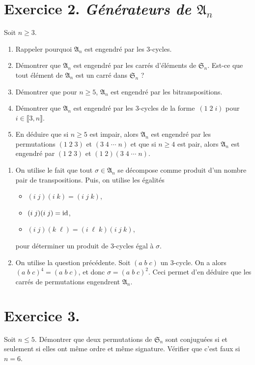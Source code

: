 \documentclass[./main]{subfiles}
\begin{document}
  \section{Exercice 2. \textit{Générateurs de $\mathfrak{A}_n$}}
  \begin{enonce}
    Soit $n \ge 3$.
    \begin{enumerate}
      \item Rappeler pourquoi $\mathfrak{A}_n$ est engendré par les $3$-cycles.
      \item Démontrer que $\mathfrak{A}_n$ est engendré par les carrés d'éléments de $\mathfrak{S}_n$.
        Est-ce que tout élément de $\mathfrak{A}_n$ est un carré dans $\mathfrak{S}_n$ ?
      \item Démontrer que pour $n \ge 5$, $\mathfrak{A}_n$ est engendré par les bitranspositions.
      \item Démontrer que $\mathfrak{A}_n$ est engendré par les $3$-cycles de la forme~$(1\;2\;i)$ pour $i \in \llbracket 3,n\rrbracket$.
      \item En déduire que si $n \ge 5$ est impair, alors $\mathfrak{A}_n$ est engendré par les permutations $(1\;2\;3)$ et $(3\;4\;\cdots\; n)$ et que si $n \ge 4$ est pair, alors $\mathfrak{A}_n$ est engendré par $(1\;2\;3)$ et $(1\;2)(3\;4\;\cdots\; n)$.
    \end{enumerate}
  \end{enonce}

  \begin{enumerate}
    \item On utilise le fait que tout $\sigma \in \mathfrak{A}_n$ se décompose comme produit d'un nombre pair de transpositions.
      Puis, on utilise les égalités 
      \begin{itemize}
        \item $(i\;j)(i\;k) = (i\;j\;k)$,
        \item $(i\;j)(i\;j) = \operatorname{id}$,
        \item $(i\;j)(k\;\ell) = (i\;\ell\;k)(i\;j\;k)$,
      \end{itemize}
      pour déterminer un produit de $3$-cycles égal à $\sigma$.
    \item On utilise la question précédente.
      Soit $(a\;b\;c)$ un $3$-cycle.
      On a alors $(a\;b\;c)^4 = (a\;b\;c)$, et donc $\sigma = (a\;b\;c)^2$.
      Ceci permet d'en déduire que les carrés de permutations engendrent $\mathfrak{A}_n$.
  \end{enumerate}

  \section{Exercice 3.}
  \begin{enonce}
    Soit $n \le 5$. Démontrer que deux permutations de $\mathfrak{S}_n$ sont conjuguées si et seulement si elles ont même ordre et même signature. Vérifier que c'est faux si $n = 6$.
  \end{enonce}
\end{document}
